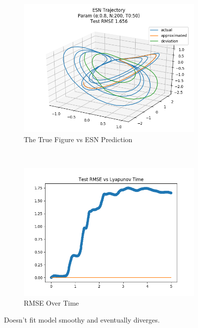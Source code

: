 \documentclass{article}
\begin{document}
\begin{figure}[H]
    \centering
    \begin{subfigure}[b]{0.45\textwidth}
        \includegraphics[width=\textwidth]{doc/paper/images/lorenz/rank_6_param_222_fit.png}
        \caption{The True Figure vs ESN Prediction}
        \label{fig:lorenz_r6_fit}
    \end{subfigure}
    ~
    \begin{subfigure}[b]{0.45\textwidth}
        \includegraphics[width=\textwidth]{doc/paper/images/lorenz/rank_6_param_222_rmse.png}
        \caption{RMSE Over Time}
        \label{fig:lorenz_r6_rmse}
    \end{subfigure}
    \caption{Doesn't fit model smoothy and eventually diverges.}
    \label{fig:lorenz_r6}
\end{figure}
\end{document}
